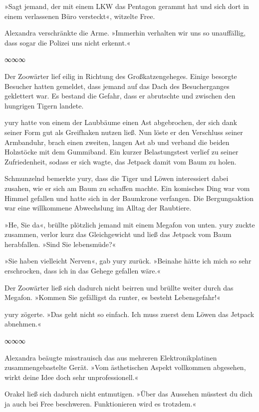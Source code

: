 »Sagt jemand, der mit einem LKW das Pentagon gerammt hat und sich dort in einem verlassenen Büro versteckt«, witzelte Free.

Alexandra verschränkte die Arme. »Immerhin verhalten wir uns so unauffällig, dass sogar die Polizei uns nicht erkennt.«

\begin{center}
	∞∞∞
\end{center}

Der Zoowärter lief eilig in Richtung des Großkatzengeheges. Einige besorgte Besucher hatten gemeldet, dass jemand auf das Dach des Besucherganges geklettert war. Es bestand die Gefahr, dass er abrutschte und zwischen den hungrigen Tigern landete.

yury hatte von einem der Laubbäume einen Ast abgebrochen, der sich dank seiner Form gut als Greifhaken nutzen ließ. Nun löste er den Verschluss seiner Armbanduhr, brach einen zweiten, langen Ast ab und verband die beiden Holzstöcke mit dem Gummiband. Ein kurzer Belastungstest verlief zu seiner Zufriedenheit, sodass er sich wagte, das Jetpack damit vom Baum zu holen.

Schmunzelnd bemerkte yury, dass die Tiger und Löwen interessiert dabei zusahen, wie er sich am Baum zu schaffen machte. Ein komisches Ding war vom Himmel gefallen und hatte sich in der Baumkrone verfangen. Die Bergungsaktion war eine willkommene Abwechslung im Alltag der Raubtiere.

»He, Sie da«, brüllte plötzlich jemand mit einem Megafon von unten. yury zuckte zusammen, verlor kurz das Gleichgewicht und ließ das Jetpack vom Baum herabfallen. »Sind Sie lebensmüde?«

»Sie haben vielleicht Nerven«, gab yury zurück. »Beinahe hätte ich mich so sehr erschrocken, dass ich in das Gehege gefallen wäre.«

Der Zoowärter ließ sich dadurch nicht beirren und brüllte weiter durch das Megafon. »Kommen Sie gefälligst da runter, es besteht Lebensgefahr!«

yury zögerte. »Das geht nicht so einfach. Ich muss zuerst dem Löwen das Jetpack abnehmen.«

\begin{center}
	∞∞∞
\end{center}

Alexandra beäugte misstrauisch das aus mehreren Elektronikplatinen zusammengebastelte Gerät. »Vom ästhetischen Aspekt vollkommen abgesehen, wirkt deine Idee doch sehr unprofessionell.«

Orakel ließ sich dadurch nicht entmutigen. »Über das Aussehen müsstest du dich ja auch bei Free beschweren. Funktionieren wird es trotzdem.«

